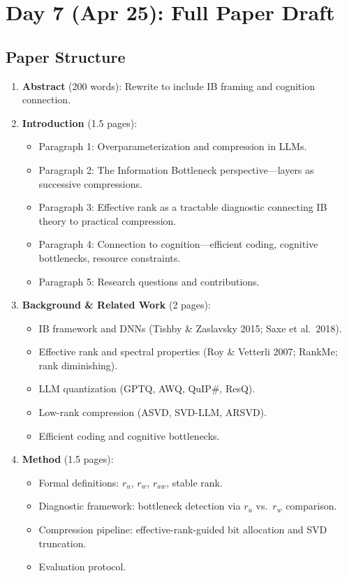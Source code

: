 \documentclass[11pt,a4paper]{article}
\begin{document}
\section{Day 7 (Apr 25): Full Paper Draft}

\subsection{Paper Structure}

\begin{enumerate}
    \item \textbf{Abstract} (200 words): Rewrite to include IB framing and cognition connection.

    \item \textbf{Introduction} (1.5 pages):
    \begin{itemize}
        \item Paragraph 1: Overparameterization and compression in LLMs.
        \item Paragraph 2: The Information Bottleneck perspective---layers as successive compressions.
        \item Paragraph 3: Effective rank as a tractable diagnostic connecting IB theory to practical compression.
        \item Paragraph 4: Connection to cognition---efficient coding, cognitive bottlenecks, resource constraints.
        \item Paragraph 5: Research questions and contributions.
    \end{itemize}

    \item \textbf{Background \& Related Work} (2 pages):
    \begin{itemize}
        \item IB framework and DNNs (Tishby \& Zaslavsky 2015; Saxe et al.\ 2018).
        \item Effective rank and spectral properties (Roy \& Vetterli 2007; RankMe; rank diminishing).
        \item LLM quantization (GPTQ, AWQ, QuIP\#, ResQ).
        \item Low-rank compression (ASVD, SVD-LLM, ARSVD).
        \item Efficient coding and cognitive bottlenecks.
    \end{itemize}

    \item \textbf{Method} (1.5 pages):
    \begin{itemize}
        \item Formal definitions: $r_u$, $r_w$, $r_{aw}$, stable rank.
        \item Diagnostic framework: bottleneck detection via $r_u$ vs.\ $r_w$ comparison.
        \item Compression pipeline: effective-rank-guided bit allocation and SVD truncation.
        \item Evaluation protocol.
    \end{itemize}


\end{enumerate}
\end{document}
